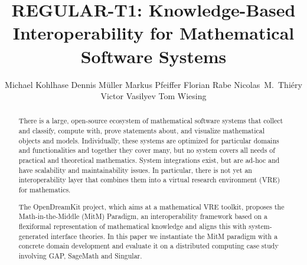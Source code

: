 \documentclass{llncs}
\title{REGULAR-T1: Knowledge-Based Interoperability for Mathematical Software Systems}
\author{
Michael Kohlhase\inst{1} 
Dennis M\"uller\inst{1} 
Markus Pfeiffer\inst{3} 
Florian Rabe\inst{2} 
Nicolas~M.~Thiéry\inst{4} 
Victor Vasilyev\inst{3} 
Tom Wiesing\inst{1}
}
\institute{
   FAU Erlangen-N\"urnberg
   \and Jacobs University Bremen
   \and University of St~Andrews 
   \and Universit\'e Paris-Sud
}
\begin{document}
\maketitle
\begin{abstract}
  There is a large, open-source ecosystem of mathematical software systems that collect and
  classify, compute with, prove statements about, and visualize mathematical objects and
  models. Individually, these systems are optimized for particular domains and
  functionalities and together they cover many, but no system covers all needs of
  practical and theoretical mathematics. System integrations exist, but are ad-hoc and
  have scalability and maintainability issues. In particular, there is not yet an
  interoperability layer that combines them into a virtual research environment (VRE) for
  mathematics.
  
  The OpenDreamKit project, which aims at a mathematical VRE toolkit, proposes the
  Math-in-the-Middle (MitM) Paradigm, an interoperability framework based on a flexiformal
  representation of mathematical knowledge and aligns this with system-generated interface
  theories. In this paper we instantiate the MitM paradigm with a concrete domain
  development and evaluate it on a distributed computing case study involving GAP,
  SageMath and Singular. 
\end{abstract}






  
  
\printbibliography
\end{document}
